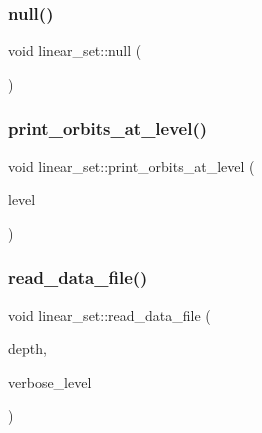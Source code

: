 \mbox{\label{classlinear__set_a0160629023f36662ae49a15a66e3ae71}} 
\subsubsection{\texorpdfstring{null()}{null()}}
{\footnotesize\ttfamily void linear\+\_\+set\+::null (\begin{DoxyParamCaption}{ }\end{DoxyParamCaption})}

\mbox{\label{classlinear__set_a39d878e47fae649413351b660a6820f5}} 
\subsubsection{\texorpdfstring{print\+\_\+orbits\+\_\+at\+\_\+level()}{print\_orbits\_at\_level()}}
{\footnotesize\ttfamily void linear\+\_\+set\+::print\+\_\+orbits\+\_\+at\+\_\+level (\begin{DoxyParamCaption}\item[{\mbox{\hyperlink{galois_8h_a09fddde158a3a20bd2dcadb609de11dc}{I\+NT}}}]{level }\end{DoxyParamCaption})}

\mbox{\label{classlinear__set_a9a5cd28cc81be7ee41002b2e3114c2cb}} 
\subsubsection{\texorpdfstring{read\+\_\+data\+\_\+file()}{read\_data\_file()}}
{\footnotesize\ttfamily void linear\+\_\+set\+::read\+\_\+data\+\_\+file (\begin{DoxyParamCaption}\item[{\mbox{\hyperlink{galois_8h_a09fddde158a3a20bd2dcadb609de11dc}{I\+NT}}}]{depth,  }\item[{\mbox{\hyperlink{galois_8h_a09fddde158a3a20bd2dcadb609de11dc}{I\+NT}}}]{verbose\+\_\+level }\end{DoxyParamCaption})}

